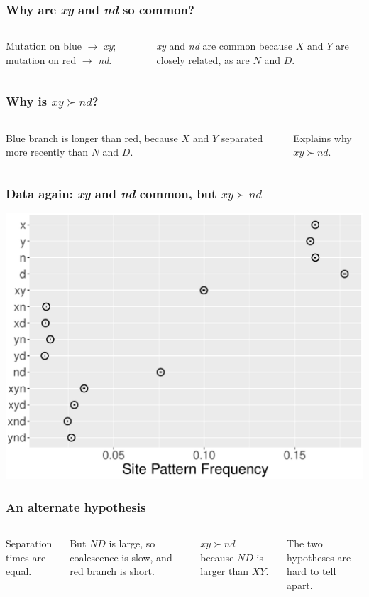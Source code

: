 \documentclass[pdftex,12pt]{beamer}
\begin{document}
\begin{frame}
  \frametitle{Why are \textit{xy} and \textit{nd} so common?}
  \begin{columns}
    
    \raggedleft
    Mutation on blue $\rightarrow$ \textit{xy};
    mutation on red $\rightarrow$ \textit{nd}.

    \bigskip

    \textit{xy} and \textit{nd} are common because $X$ and $Y$ are
    closely related, as are $N$ and $D$.
  \end{columns}
\end{frame}

\begin{frame}
  \frametitle{Why is $xy \succ nd$?}
  \begin{columns}
    
    \raggedleft
    Blue branch is longer than red, because $X$ and $Y$ separated more
    recently than $N$ and $D$.

    \bigskip

    Explains why $xy \succ nd$.
  \end{columns}
\end{frame}

\begin{frame}
  \frametitle{Data again: \textit{xy} and \textit{nd} common, but
  $xy \succ nd$}
    {\centering\includegraphics[width=0.9\linewidth]{xynd-frq.pdf}\\}
\end{frame}

\begin{frame}
  \frametitle{An alternate hypothesis}
  \begin{columns}
    
    \raggedleft
    Separation times are equal.

    \bigskip
    
    But $ND$ is large, so coalescence is slow, and red branch is short.

    \bigskip

    $xy \succ nd$ because $ND$ is larger than $XY$.

    \bigskip

    The two hypotheses are hard to tell apart.
  \end{columns}
\end{frame}
\end{document}
